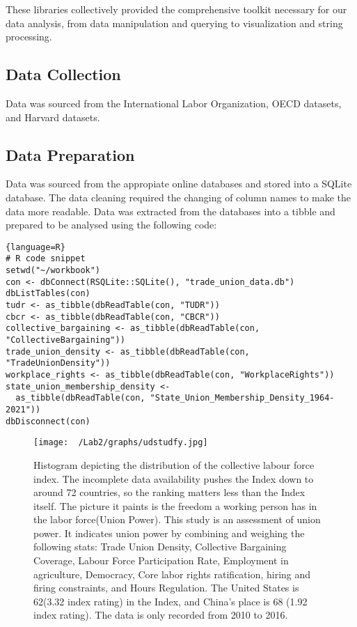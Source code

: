 \documentclass[11pt]{article}\usepackage[]{graphicx}\usepackage[]{xcolor}
\begin{document}
These libraries collectively provided the comprehensive toolkit necessary for our data analysis, from data manipulation and querying to visualization and string processing.

\subsection{Data Collection}
Data was sourced from the International Labor Organization, OECD datasets, and Harvard datasets.

\subsection{Data Preparation}
Data was sourced from the appropiate online databases and stored into a SQLite database. The data cleaning required the changing of column names to make the data more readable. Data was extracted from the databases into a tibble and prepared to be analysed using the following code: 
\begin{lstlisting}{language=R}
# R code snippet
setwd("~/workbook")
con <- dbConnect(RSQLite::SQLite(), "trade_union_data.db")
dbListTables(con)
tudr <- as_tibble(dbReadTable(con, "TUDR"))
cbcr <- as_tibble(dbReadTable(con, "CBCR"))
collective_bargaining <- as_tibble(dbReadTable(con, "CollectiveBargaining"))
trade_union_density <- as_tibble(dbReadTable(con, "TradeUnionDensity"))
workplace_rights <- as_tibble(dbReadTable(con, "WorkplaceRights"))
state_union_membership_density <-
  as_tibble(dbReadTable(con, "State_Union_Membership_Density_1964-2021"))
dbDisconnect(con)
\end{lstlisting}



\begin{figure}[h]
\centering
  \begin{minipage}{0.7\linewidth}
  \texttt{[image: ~/Lab2/graphs/udstudfy.jpg]}
  \caption{Histogram depicting the distribution of the collective labour force index. The incomplete data availability pushes the Index down to around 72 countries, so the ranking matters less than the Index itself. The picture it paints is the freedom a working person has in the labor force(Union Power). This study is an assessment of union power. It indicates union power by combining and weighing the following stats: Trade Union Density, Collective Bargaining Coverage, Labour Force Participation Rate, Employment in agriculture, Democracy, Core labor rights ratification, hiring and firing constraints, and Hours Regulation. The United States is 62(3.32 index rating) in the Index, and China's place is 68 (1.92 index rating). The data is only recorded from 2010 to 2016. }
  \label{fig:1.0}
  \end{minipage}
\end{figure}
\end{document}
